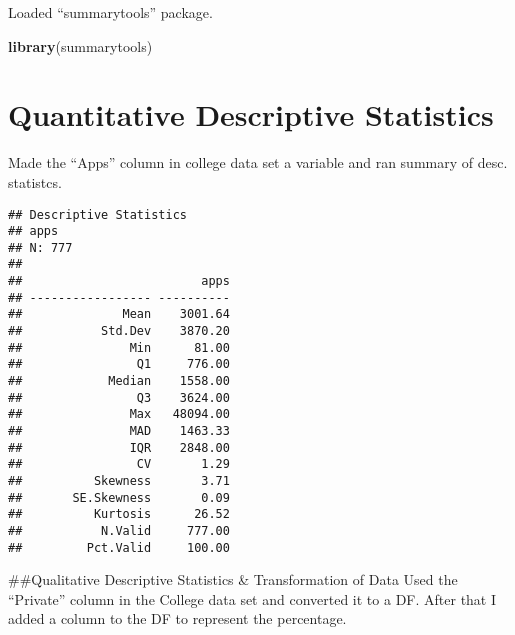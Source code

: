 \documentclass[
]{article}
\newenvironment{Shaded}{\begin{snugshade}}{\end{snugshade}}
\newcommand{\DataTypeTok}[1]{\textcolor[rgb]{0.13,0.29,0.53}{#1}}
\newcommand{\KeywordTok}[1]{\textcolor[rgb]{0.13,0.29,0.53}{\textbf{#1}}}
\newcommand{\NormalTok}[1]{#1}
\newcommand{\OperatorTok}[1]{\textcolor[rgb]{0.81,0.36,0.00}{\textbf{#1}}}
\newcommand{\StringTok}[1]{\textcolor[rgb]{0.31,0.60,0.02}{#1}}
\begin{document}
Loaded ``summarytools'' package.

\begin{Shaded}
\begin{Highlighting}[]
\KeywordTok{library}\NormalTok{(summarytools)}
\end{Highlighting}
\end{Shaded}

\hypertarget{quantitative-descriptive-statistics}{%
\section{Quantitative Descriptive
Statistics}\label{quantitative-descriptive-statistics}}

Made the ``Apps'' column in college data set a variable and ran summary
of desc. statistcs.

\begin{Shaded}
\end{Shaded}

\begin{verbatim}
## Descriptive Statistics  
## apps  
## N: 777  
## 
##                         apps
## ----------------- ----------
##              Mean    3001.64
##           Std.Dev    3870.20
##               Min      81.00
##                Q1     776.00
##            Median    1558.00
##                Q3    3624.00
##               Max   48094.00
##               MAD    1463.33
##               IQR    2848.00
##                CV       1.29
##          Skewness       3.71
##       SE.Skewness       0.09
##          Kurtosis      26.52
##           N.Valid     777.00
##         Pct.Valid     100.00
\end{verbatim}

\#\#Qualitative Descriptive Statistics \& Transformation of Data Used
the ``Private'' column in the College data set and converted it to a DF.
After that I added a column to the DF to represent the percentage.
\end{document}
